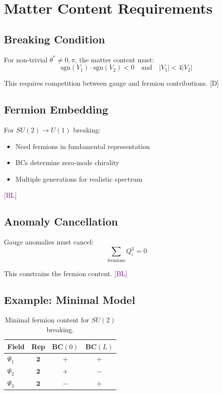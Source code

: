 \documentclass[11pt,a4paper]{article}
\newcommand{\tagD}{\textcolor{blue!70!black}{[D]}}
\newcommand{\tagBL}{\textcolor{purple}{[BL]}}
\begin{document}
\section{Matter Content Requirements}

\subsection{Breaking Condition}

For non-trivial $\theta^* \neq 0, \pi$, the matter content must:
\begin{equation}
\label{eq:breaking-cond}
\text{sgn}(V_1) \cdot \text{sgn}(V_2) < 0 \quad \text{and} \quad |V_1| < 4|V_2|
\end{equation}

This requires competition between gauge and fermion contributions. \tagD

\subsection{Fermion Embedding}

For $SU(2) \to U(1)$ breaking:
\begin{itemize}
    \item Need fermions in fundamental representation
    \item BCs determine zero-mode chirality
    \item Multiple generations for realistic spectrum
\end{itemize}

\tagBL

\subsection{Anomaly Cancellation}

Gauge anomalies must cancel:
\begin{equation}
\label{eq:anomaly}
\sum_{\text{fermions}} Q_i^3 = 0
\end{equation}

This constrains the fermion content. \tagBL

\subsection{Example: Minimal Model}

\begin{table}[h]
\centering
\begin{tabular}{lccc}
\toprule
Field & Rep & BC$(0)$ & BC$(L)$ \\
\midrule
$\Psi_1$ & $\mathbf{2}$ & $+$ & $+$ \\
$\Psi_2$ & $\mathbf{2}$ & $+$ & $-$ \\
$\Psi_3$ & $\mathbf{2}$ & $-$ & $+$ \\
\bottomrule
\end{tabular}
\caption{Minimal fermion content for $SU(2)$ breaking.}
\label{tab:fermions}
\end{table}
\end{document}
